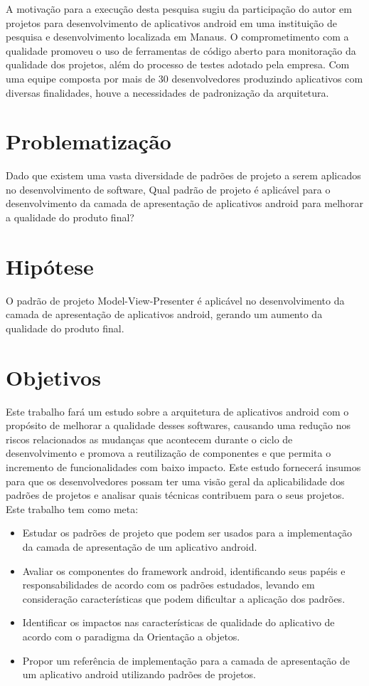 A motivação para a execução desta pesquisa sugiu da participação do autor em
projetos para desenvolvimento de aplicativos android em uma instituição de
pesquisa e desenvolvimento localizada em Manaus. O comprometimento com a
qualidade promoveu o uso de ferramentas de código aberto para monitoração da
qualidade dos projetos, além do processo de testes adotado pela empresa. Com uma
equipe composta por mais de 30 desenvolvedores produzindo aplicativos com
diversas finalidades, houve a necessidades de padronização da arquitetura.

\section{Problematização}
Dado que existem uma vasta diversidade de padrões de projeto a serem aplicados
no desenvolvimento de software, Qual padrão de projeto é aplicável para o
desenvolvimento da camada de apresentação de aplicativos android para melhorar a
qualidade do produto final?

\section{Hipótese}

O padrão de projeto Model-View-Presenter é aplicável no desenvolvimento da
camada de apresentação de aplicativos android, gerando um aumento da qualidade
do produto final.

\section{Objetivos}

Este trabalho fará um estudo sobre a arquitetura de aplicativos android com o
propósito de melhorar a qualidade desses softwares, causando uma redução nos
riscos relacionados as mudanças que acontecem durante o ciclo de desenvolvimento
e promova a reutilização de componentes e que permita o incremento de funcionalidades com
baixo impacto. Este estudo fornecerá insumos para que os desenvolvedores possam
ter uma visão geral da aplicabilidade dos padrões de projetos e analisar quais
técnicas contribuem para o seus projetos. Este trabalho tem como meta:

\begin{itemize}
\item Estudar os padrões de projeto que podem ser usados para a implementação da
camada de apresentação de um aplicativo android.
\item Avaliar os componentes do  framework android, identificando seus papéis e
responsabilidades de acordo com os padrões estudados, levando  em consideração
características que podem dificultar a aplicação dos padrões. 
\item Identificar os impactos nas características de qualidade do aplicativo de acordo
com o paradigma da Orientação a objetos.
\item Propor um referência de implementação para a  camada de apresentação de um
aplicativo android utilizando padrões de projetos.
\end{itemize}

